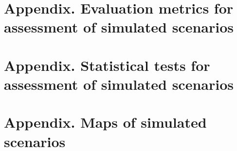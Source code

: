 \chapter{Appendix. Evaluation metrics for assessment of simulated scenarios}
\label{ch:appendix_LCBM_evaluation_metrics}

\graphicspath{{chapters/appendix_LCBM/figures}}



\chapter{Appendix. Statistical tests for assessment of simulated scenarios}
\label{ch:appendix_LCBM_stats_tests}

%     
%     

% 

% 


\chapter{Appendix. Maps of simulated scenarios}
\label{ch:appendix_LCBM_maps}

